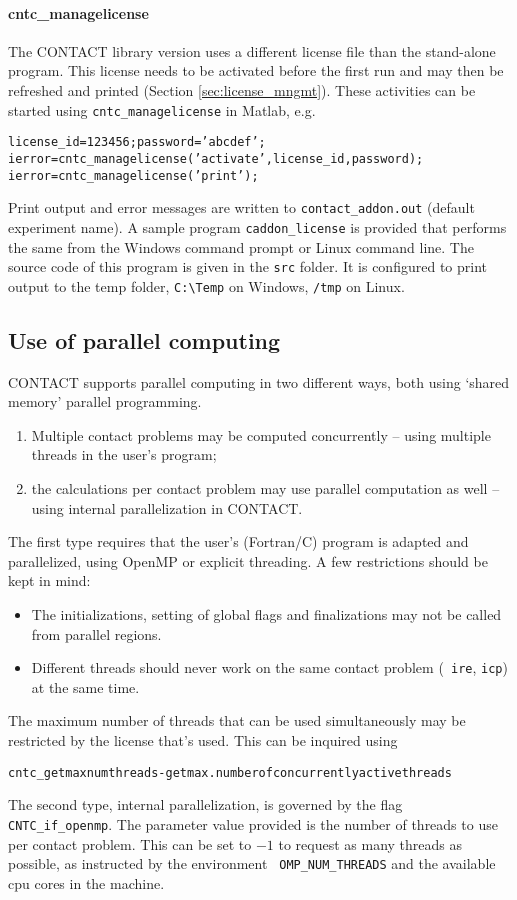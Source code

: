 \documentclass[12pt]{report}
\begin{document}
\paragraph{cntc\_managelicense}

The CONTACT library version uses a different license file than the
stand-alone program. This license needs to be activated before the first
run and may then be refreshed and printed (Section \ref{sec:license_mngmt}).
These activities can be started using {\tt cntc\_manage\-li\-cense} in Matlab,
e.g.\
\begin{alltt}\small
    license_id = 123456; password = 'abcdef';
    ierror = cntc_managelicense('activate', license_id, password);
    ierror = cntc_managelicense('print');
\end{alltt}
Print output and error messages are written to {\tt contact\_addon.out}
(default experiment name). A sample program {\tt caddon\_license} is
provided that performs the same from the Windows command prompt or Linux
command line. The source code of this program is given in the {\tt src}
folder. It is configured to print output to the temp folder, \verb+C:\Temp+
on Windows, \verb+/tmp+ on Linux.

\subsection{Use of parallel computing}

CONTACT supports parallel computing in two different ways, both using
`shared memory' parallel programming.
\begin{enumerate}
\item Multiple contact problems may be computed concurrently -- using
        multiple threads in the user's program;
\item the calculations per contact problem may use parallel computation
        as well -- using internal parallelization in CONTACT.
\end{enumerate}
The first type requires that the user's (Fortran/C) program is adapted and
parallelized, using OpenMP or explicit threading. A few restrictions should
be kept in mind:
\begin{itemize}
\item The initializations, setting of global flags and finalizations may
        not be called from parallel regions.
\item Different threads should never work on the same contact problem ({\tt
        ire}, {\tt icp}) at the same time.
\end{itemize}
The maximum number of threads that can be used simultaneously may be
restricted by the license that's used. This can be inquired using
\begin{alltt}\small
cntc_getmaxnumthreads       - get max.number of concurrently active threads
\end{alltt}
The second type, internal parallelization, is governed by the flag {\tt
CNTC\_if\_openmp}. The parameter value provided is the number of threads
to use per contact problem. This can be set to $-1$ to request as many
threads as possible, as instructed by the environment {\tt
OMP\_NUM\_THREADS} and the available cpu cores in the machine.
\end{document}
